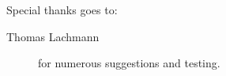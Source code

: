 %
Special thanks goes to:
\begin{description}
  \item[Thomas Lachmann] for numerous suggestions and testing.
\end{description}
